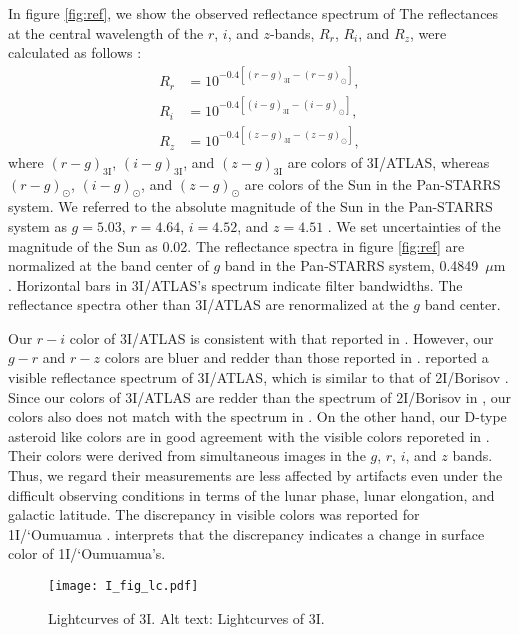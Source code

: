 \documentclass[]{pasj02}
\newcommand\I{3I/ATLAS\xspace}
\begin{document}
In figure \ref{fig:ref}, we show the observed reflectance spectrum of 
The reflectances at the central wavelength of the $r$, $i$, and $z$-bands, 
$R_r$, $R_i$, and $R_z$, were calculated as follows \citep[e.g.,][]{DeMeo2013}:
\begin{eqnarray}
    R_r &= 10^{-0.4[(r-g)_{\mathrm{3I}}-(r-g)_\odot]}, \\
    R_i &= 10^{-0.4[(i-g)_{\mathrm{3I}}-(i-g)_\odot]}, \\
    R_z &= 10^{-0.4[(z-g)_{\mathrm{3I}}-(z-g)_\odot]}, 
\end{eqnarray}
where 
$(r-g)_\mathrm{3I}$, $(i-g)_\mathrm{3I}$, and $(z-g)_\mathrm{3I}$ 
are colors of \I,
whereas
$(r-g)_\odot$, $(i-g)_\odot$, and $(z-g)_\odot$ 
are colors of the Sun in the Pan-STARRS system.
We referred to the absolute magnitude of the Sun in the Pan-STARRS system as
$g = 5.03$, $r=4.64$, $i=4.52$, and $z=4.51$ \citep{Willmer2018}.
We set uncertainties of the magnitude of the Sun as 0.02.
The reflectance spectra in figure \ref{fig:ref} 
are normalized at the band center of $g$ band in the Pan-STARRS system, 0.4849~$\mu$m \citep{Willmer2018}.
Horizontal bars in \I's spectrum indicate filter bandwidths.
The reflectance spectra other than \I are renormalized at the $g$ band center.

Our $r-i$ color of \I is consistent with that reported in \cite{Bolin2025_3I}.
However, our $g-r$ and $r-z$ colors are bluer and redder 
than those reported in \cite{Bolin2025_3I}.
\cite{Belyakov2025_3I} reported a visible reflectance 
spectrum of \I, which is similar to that of 2I/Borisov \citep{deLeon2020}.
Since our colors of \I are redder than the spectrum of 2I/Borisov in \cite{deLeon2020}, 
our colors also does not match with the spectrum in \cite{Belyakov2025_3I}.
On the other hand, our D-type asteroid like colors are 
in good agreement with the visible colors reporeted in 
\citep{Seligman2023}.
Their colors were derived from simultaneous images in
the $g$, $r$, $i$, and $z$ bands.
Thus, we regard their measurements are less affected 
by artifacts even under the difficult observing 
conditions in terms of the lunar phase, lunar elongation,
and galactic latitude.
The discrepancy in visible colors was reported for 1I/`Oumuamua \citep{Meech2017, Jewitt2017, Bannister2017}.
\citet{Bannister2017} interprets that the discrepancy indicates a change in surface color of 1I/`Oumuamua's. 

\begin{figure}
 \begin{center}
  \texttt{[image: I\_fig\_lc.pdf]} 
 \end{center}
\caption{
    Lightcurves of 3I.
    {Alt text: Lightcurves of 3I.} 
}\label{fig:lc}
\end{figure}
\end{document}
